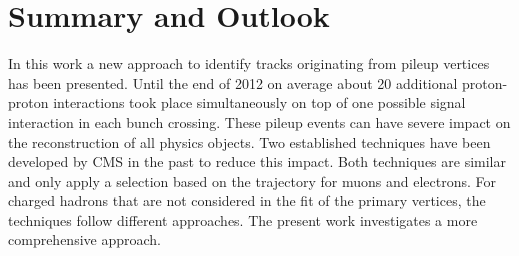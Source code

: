 \chapter{Summary and Outlook \label{sec:SandO}}

In this work a new approach to identify tracks originating from pileup vertices has been presented. Until the end of 2012 on average about 20 additional proton-proton interactions took place simultaneously on top of one possible signal interaction in each bunch crossing. These pileup events can have severe impact on the reconstruction of all physics objects. Two established techniques have been developed by CMS in the past to reduce this impact. Both techniques are similar and only apply a selection based on the trajectory for muons and electrons. For charged hadrons that are not considered in the fit of the primary vertices, the techniques follow different approaches. The present work investigates a more comprehensive approach.

